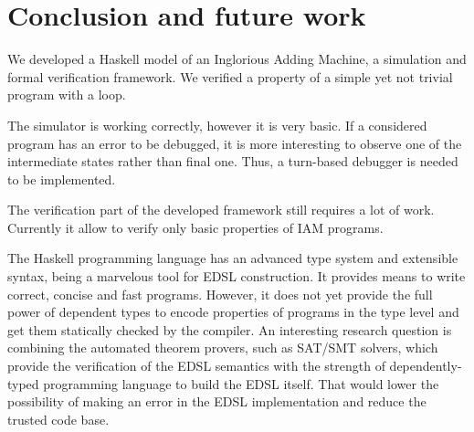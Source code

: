 \section{Conclusion and future work}

We developed a Haskell model of an Inglorious Adding Machine, a simulation and formal verification framework. We verified a property of a simple yet not trivial program with a loop.

The simulator is working correctly, however it is very basic. If a considered program has an error to be
debugged, it is more interesting to observe one of the intermediate states rather than final one.
Thus, a turn-based debugger is needed to be implemented.

The verification part of the developed framework still requires a lot of work. Currently it allow to verify
only basic properties of IAM programs.

The Haskell programming language has an advanced type system and extensible syntax, being a marvelous tool for EDSL construction. It provides means to write correct, concise and fast programs. However, it does not yet provide the full power of dependent types to encode properties of programs in the type level and get them statically checked by the compiler. An interesting research question is combining the automated theorem provers, such as SAT/SMT solvers, which provide the verification of the EDSL semantics with the strength of dependently-typed programming language to build the EDSL itself. That would lower the possibility of making an error in the EDSL implementation and reduce the trusted code base.
